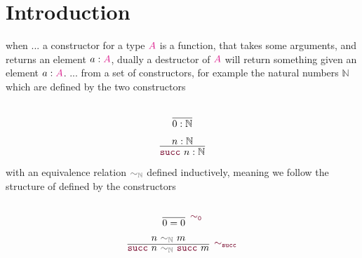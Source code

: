 \documentclass[twoside,11pt,openright]{report}
\theoremstyle{plain} %
\theoremstyle{definition}
\theoremstyle{remark}
\newcommand*{\type}[1]{\textcolor{magenta!90!black}{#1}}
\newcommand*{\relation}[1]{\textcolor{gray!75!black}{\ensuremath{\mathtt{#1}}}}
\newcommand*{\constructor}[1]{\textcolor{purple!60!black}{\ensuremath{\mathtt{#1}}}}
\begin{document}
\tableofcontents
\cleardoublepage
{}
\setcounter{secnumdepth}{3} %


\chapter{Introduction} %
\label{ch:intro}
when ... a constructor for a type \(\type{A}\) is a function, that takes some arguments, and returns an element \(a : \type{A}\), dually a destructor of \(\type{A}\) will return something given an element \(a : \type{A}\). ... from a set of constructors, for example the natural numbers \(\mathbb{N}\) which are defined by the two constructors
\begin{center}
  \strut
  \hfill
  \begin{minipage}{0.15\linewidth}
    \begin{equation}
      \vcenter{\infer{0 : \mathbb{N}}{\strut}}
    \end{equation}
  \end{minipage}
  \hfill
  \begin{minipage}{0.20\linewidth}
    \begin{equation}
      \vcenter{\infer{\constructor{succ}~n : \mathbb{N}}{n : \mathbb{N}}}
    \end{equation}
  \end{minipage}
  \hfill
  \strut
\end{center}
with an equivalence relation \(\relation{\sim_{\mathbb{N}}}\) defined inductively, meaning we follow the structure of defined by the constructors
\begin{center}
  \strut
  \hfill
  \begin{minipage}{0.20\linewidth}
    \begin{equation}
      \vcenter{\infer[\constructor{\sim_{0}}]{0 = 0}{\strut}}
    \end{equation}
  \end{minipage}
  \hfill
  \begin{minipage}{0.35\linewidth}
    \begin{equation}
      \vcenter{\infer[\constructor{\sim_{succ}}]{\constructor{succ}~n~\relation{\sim_{\mathbb{N}}}~\constructor{succ}~m}{n~\relation{\sim_{\mathbb{N}}}~m}}
    \end{equation}
  \end{minipage}
  \hfill
  \strut
\end{center}
\end{document}
